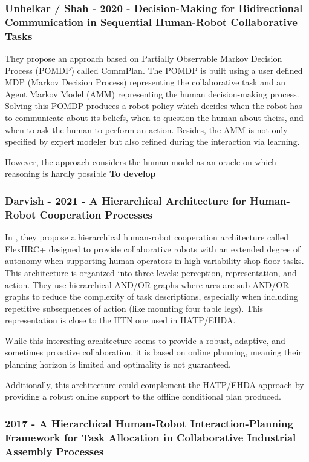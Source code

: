 \subsubsection{Unhelkar / Shah - 2020 - Decision-Making for Bidirectional Communication in Sequential Human-Robot Collaborative Tasks}
\label{w5}

They propose an approach based on Partially Observable Markov Decision Process (POMDP) called CommPlan. The POMDP is built using a user defined MDP (Markov Decision Process) representing the collaborative task and an Agent Markov Model (AMM) representing the human decision-making process. Solving this POMDP produces a robot policy which decides when the robot has to communicate about its beliefs, when to question the human about theirs, and when to ask the human to perform an action.
Besides, the AMM is not only specified by expert modeler but also refined during the interaction via learning. 

However, the approach considers the human model as an oracle on which reasoning is hardly possible \textbf{To develop}

\subsubsection{Darvish - 2021 - A Hierarchical Architecture for Human-Robot Cooperation Processes}
\label{w6}

In \cite{DarvishSMC21}, they propose a hierarchical human-robot cooperation architecture called FlexHRC+ designed to provide collaborative robots with an extended degree of autonomy when supporting human operators in high-variability shop-floor tasks. This architecture is organized into three levels: perception, representation, and action. 
They use hierarchical AND/OR graphs where arcs are sub AND/OR graphs to reduce the complexity of task descriptions, especially when including repetitive subsequences of action (like mounting four table legs). This representation is close to the HTN one used in HATP/EHDA. 

While this interesting architecture seems to provide a robust, adaptive, and sometimes proactive collaboration, it is based on online planning, meaning their planning horizon is limited and optimality is not guaranteed. 

Additionally, this architecture could complement the HATP/EHDA approach by providing a robust online support to the offline conditional plan produced. 


\subsubsection{2017 - A Hierarchical Human-Robot Interaction-Planning Framework for Task Allocation in Collaborative Industrial Assembly Processes}
\label{w7}


